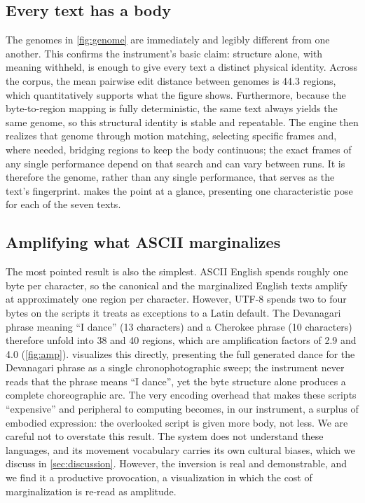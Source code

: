 \documentclass{vgtc}                          %
\begin{document}
\subsection{Every text has a body}
The genomes in \cref{fig:genome} are immediately and legibly different from one
another. This confirms the instrument's basic claim: structure alone, with meaning
withheld, is enough to give every text a distinct physical identity. Across the
corpus, the mean pairwise edit distance between genomes is 44.3 regions, which
quantitatively supports what the figure shows. Furthermore, because the
byte-to-region mapping is fully deterministic, the same text always yields the same
genome, so this structural identity is stable and repeatable. The engine then
realizes that genome through motion matching, selecting specific frames and, where
needed, bridging regions to keep the body continuous; the exact frames of any
single performance depend on that search and can vary between runs. It is therefore
the genome, rather than any single performance, that serves as the text's
fingerprint.  makes the point at a glance, presenting one
characteristic pose for each of the seven texts.

\subsection{Amplifying what ASCII marginalizes}
The most pointed result is also the simplest. ASCII English spends roughly one
byte per character, so the canonical and the marginalized English texts amplify at
approximately one region per character. However, UTF-8 spends two to four bytes on
the scripts it treats as exceptions to a Latin default. The Devanagari phrase
meaning ``I dance'' (13 characters) and a Cherokee phrase (10 characters)
therefore unfold into 38 and 40 regions, which are amplification factors of 2.9
and 4.0 (\cref{fig:amp}).  visualizes this directly, presenting the
full generated dance for the Devanagari phrase as a single chronophotographic
sweep; the instrument never reads that the phrase means ``I dance'', yet the byte
structure alone produces a complete choreographic arc. The very encoding overhead
that makes these scripts ``expensive'' and peripheral to computing becomes, in our
instrument, a surplus of embodied expression: the overlooked script is given more
body, not less. We are careful not to overstate this result. The system does not
understand these languages, and its movement vocabulary carries its own cultural
biases, which we discuss in \cref{sec:discussion}. However, the inversion is real
and demonstrable, and we find it a productive provocation, a visualization in which
the cost of marginalization is re-read as amplitude.
\end{document}
